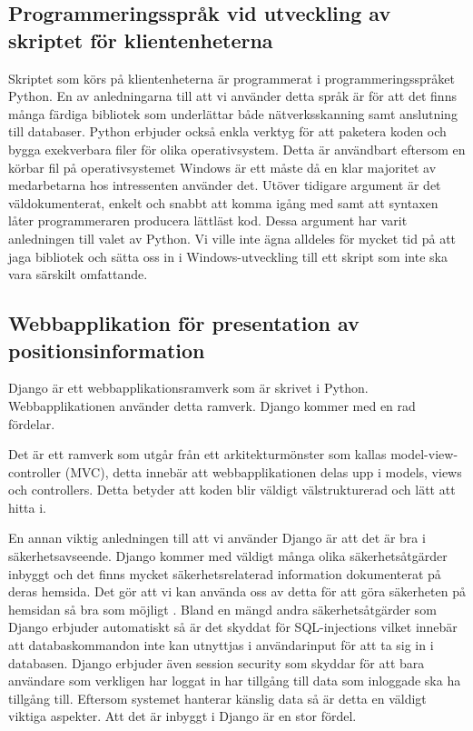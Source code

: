 \documentclass[swedish, a4paper,12pt]{article}
\begin{document}
\subsection{Programmeringsspråk vid utveckling av skriptet för klientenheterna}
Skriptet som körs på klientenheterna är programmerat i programmeringsspråket Python. En av anledningarna till att vi använder detta språk är för att det finns många färdiga bibliotek som underlättar både nätverksskanning samt anslutning till databaser. Python erbjuder också enkla verktyg för att paketera koden och bygga exekverbara filer för olika operativsystem. Detta är användbart eftersom en körbar fil på operativsystemet Windows är ett måste då en klar majoritet av medarbetarna hos intressenten använder det. Utöver tidigare argument är det väldokumenterat, enkelt och snabbt att komma igång med samt att syntaxen låter programmeraren producera lättläst kod. Dessa argument har varit anledningen till valet av Python. Vi ville inte ägna alldeles för mycket tid på att jaga bibliotek och sätta oss in i Windows-utveckling till ett skript som inte ska vara särskilt omfattande.

\subsection{Webbapplikation för presentation av positionsinformation}\label{django}
Django är ett webbapplikationsramverk som är skrivet i Python. Webbapplikationen använder detta ramverk. Django kommer med en rad fördelar.

Det är ett ramverk som utgår från ett arkitekturmönster som kallas model-view-controller (MVC)\cite{djangoMVC}, detta innebär att webbapplikationen delas upp i models, views och controllers. Detta betyder att koden blir väldigt välstrukturerad och lätt att hitta i.

En annan viktig anledningen till att vi använder Django är att det är bra i säkerhetsavseende. Django kommer med väldigt många olika säkerhetsåtgärder inbyggt och det finns mycket säkerhetsrelaterad information dokumenterat på deras hemsida. Det gör att vi kan använda oss av detta för att göra säkerheten på hemsidan så bra som möjligt \cite{securityInDjango}. Bland en mängd andra säkerhetsåtgärder som Django erbjuder automatiskt så är det skyddat för SQL-injections \cite{securityInDjango} vilket innebär att databaskommandon inte kan utnyttjas i användarinput för att ta sig in i databasen. Django erbjuder även session security \cite{securityInDjango} som skyddar för att bara användare som verkligen har loggat in har tillgång till data som inloggade ska ha tillgång till.
Eftersom systemet hanterar känslig data så är detta en väldigt viktiga aspekter. Att det är inbyggt i Django är en stor fördel.
\end{document}
